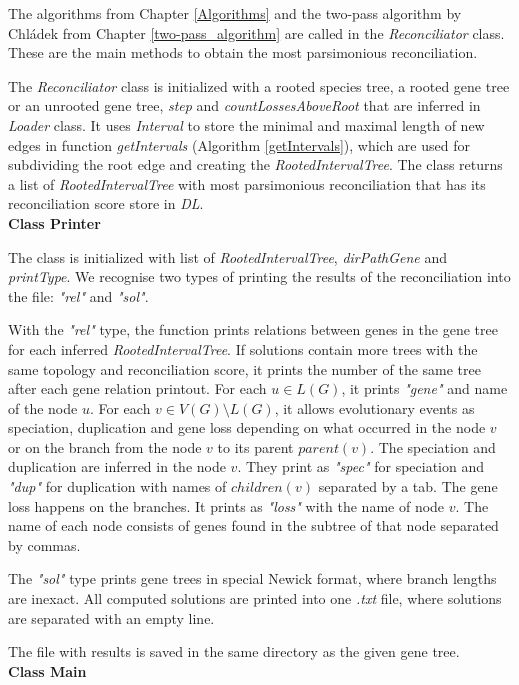 The algorithms from Chapter \ref{Algorithms} and the two-pass algorithm by Chládek from Chapter \ref{two-pass_algorithm} are called in the \emph{Reconciliator} class. These are the main methods to obtain the most parsimonious reconciliation.

The \emph{Reconciliator} class is initialized with a rooted species tree, a rooted gene tree or an unrooted gene tree, \emph{step} and \emph{countLossesAboveRoot} that are inferred in \emph{Loader} class. It uses \emph{Interval} to store the minimal and maximal length of new edges in function \emph{getIntervals} (Algorithm \ref{getIntervals}), which are used for subdividing the root edge and creating the \emph{RootedIntervalTree}. The class returns a list of \emph{RootedIntervalTree} with most parsimonious reconciliation that has its reconciliation score store in \emph{DL}.\\
\textbf{Class Printer}

The class is initialized with list of \emph{RootedIntervalTree}, \emph{dirPathGene} and \emph{printType}. We recognise two types of printing the results of the reconciliation into the file: \emph{"rel"} and \emph{"sol"}.

With the \emph{"rel"} type, the function prints relations between genes in the gene tree for each inferred \emph{RootedIntervalTree}. If solutions contain more trees with the same topology and reconciliation score, it prints the number of the same tree after each gene relation printout. For each $u \in L(G)$, it prints \emph{"gene"} and name of the node $u$. For each $v \in V(G)\setminus L(G)$, it allows evolutionary events as speciation, duplication and gene loss depending on what occurred in the node $v$ or on the branch from the node $v$ to its parent $parent(v)$. The speciation and duplication are inferred in the node $v$. They print as \emph{"spec"} for speciation and \emph{"dup"} for duplication with names of $children(v)$ separated by a tab. The gene loss happens on the branches. It prints as \emph{"loss"} with the name of node $v$. The name of each node consists of genes found in the subtree of that node separated by commas. 

The \emph{"sol"} type prints gene trees in special Newick format, where branch lengths are inexact. All computed solutions are printed into one \emph{.txt} file, where solutions are separated with an empty line.

The file with results is saved in the same directory as the given gene tree.\\
\textbf{Class Main}

